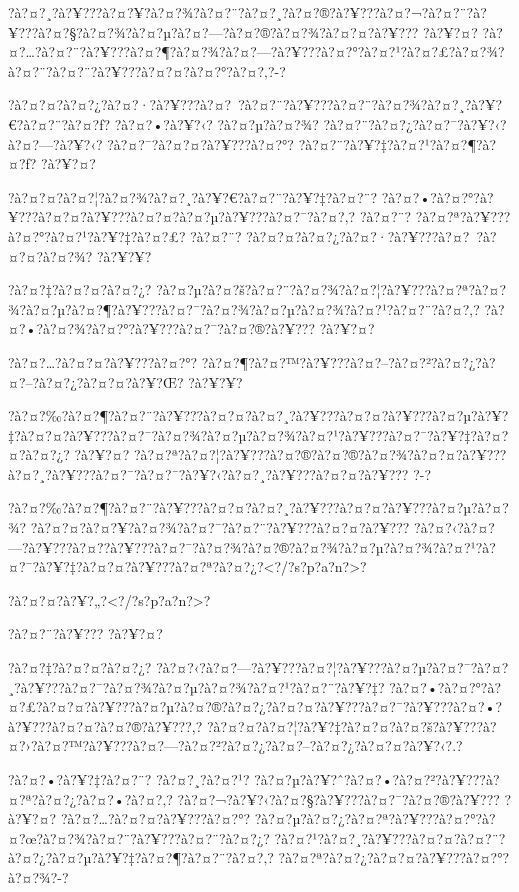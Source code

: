 \documentclass[11pt, openany]{book}
\begin{document}
{{{{{{{{{{?à?¤?¸?à?¥???à?¤?¥?à?¤?¾?à?¤?¨?à?¤?¸?à?¤?®?à?¥???à?¤?¬?à?¤?¨?à?¥???à?¤?§?à?¤?¾?à?¤?µ?à?¤?---?à?¤?®?à?¤?¾?à?¤?¤?à?¥???
?à?¥?¤?
?à?¤?\ldots{}?à?¤?¨?à?¥???à?¤?¶?à?¤?¾?à?¤?---?à?¥???à?¤?°?à?¤?¹?à?¤?£?à?¤?¾?à?¤?¨?à?¤?¨?à?¥???à?¤?¤?à?¤?°?à?¤?‚?-?

?à?¤?¤?à?¤?¿?à?¤?·?à?¥???à?¤?~?à?¤?¨?à?¥???à?¤?¨?à?¤?¾?à?¤?¸?à?¥?€?à?¤?¨?à?¤?ƒ?
?à?¤?•?à?¥?‹? ?à?¤?µ?à?¤?¾? ?à?¤?¨?à?¤?¿?à?¤?¯?à?¥?‹?à?¤?---?à?¥?‹?
?à?¤?¯?à?¤?¤?à?¥???à?¤?°? ?à?¤?¨?à?¥?‡?à?¤?¹?à?¤?¶?à?¤?ƒ? ?à?¥?¤?

?à?¤?¤?à?¤?¦?à?¤?¾?à?¤?¸?à?¥?€?à?¤?¨?à?¥?‡?à?¤?¨?
?à?¤?•?à?¤?°?à?¥???à?¤?¤?à?¥???à?¤?¤?à?¤?µ?à?¥???à?¤?¯?à?¤?‚? ?à?¤?¨?
?à?¤?ª?à?¥???à?¤?°?à?¤?¹?à?¥?‡?à?¤?£? ?à?¤?¨?
?à?¤?¤?à?¤?¿?à?¤?·?à?¥???à?¤?~?à?¤?¤?à?¤?¾? ?à?¥?¥?

?à?¤?‡?à?¤?¤?à?¤?¿?
?à?¤?µ?à?¤?š?à?¤?¨?à?¤?¾?à?¤?¦?à?¥???à?¤?ª?à?¤?¾?à?¤?µ?à?¤?¶?à?¥???à?¤?¯?à?¤?¾?à?¤?µ?à?¤?¾?à?¤?¹?à?¤?¨?à?¤?‚?
?à?¤?•?à?¤?¾?à?¤?°?à?¥???à?¤?¯?à?¤?®?à?¥??? ?à?¥?¤?

?à?¤?\ldots{}?à?¤?¤?à?¥???à?¤?°?
?à?¤?¶?à?¤?™?à?¥???à?¤?--?à?¤?²?à?¤?¿?à?¤?--?à?¤?¿?à?¤?¤?à?¥?Œ? ?à?¥?¥?

?à?¤?‰?à?¤?¶?à?¤?¨?à?¥???à?¤?¤?à?¤?¸?à?¥???à?¤?¤?à?¥???à?¤?µ?à?¥?‡?à?¤?¤?à?¥???à?¤?¯?à?¤?¾?à?¤?µ?à?¤?¾?à?¤?¹?à?¥???à?¤?¯?à?¥?‡?à?¤?¤?à?¤?¿?
?à?¥?¤?
?à?¤?ª?à?¤?¦?à?¥???à?¤?®?à?¤?®?à?¤?¾?à?¤?¤?à?¥???à?¤?¸?à?¥???à?¤?¯?à?¤?¯?à?¥?‹?à?¤?¸?à?¥???à?¤?¤?à?¥???
?-?

?à?¤?‰?à?¤?¶?à?¤?¨?à?¥???à?¤?¤?à?¤?¸?à?¥???à?¤?¤?à?¥???à?¤?µ?à?¤?¾?
?à?¤?¤?à?¤?¥?à?¤?¾?à?¤?¯?à?¤?¨?à?¥???à?¤?¤?à?¥???
?à?¤?‹?à?¤?---?à?¥???à?¤?­?à?¥???à?¤?¯?à?¤?¾?à?¤?®?à?¤?¾?à?¤?µ?à?¤?¾?à?¤?¹?à?¤?¯?à?¥?‡?à?¤?¤?à?¥???à?¤?ª?à?¤?¿?\textless{}?/?s?p?a?n?\textgreater{}?

?à?¤?¤?à?¥?„?\textless{}?/?s?p?a?n?\textgreater{}?

?à?¤?¨?à?¥??? ?à?¥?¤?

?à?¤?‡?à?¤?¤?à?¤?¿?
?à?¤?‹?à?¤?---?à?¥???à?¤?¦?à?¥???à?¤?µ?à?¤?¯?à?¤?¸?à?¥???à?¤?¯?à?¤?¾?à?¤?µ?à?¤?¾?à?¤?¹?à?¤?¨?à?¥?‡?
?à?¤?•?à?¤?°?à?¤?£?à?¤?¤?à?¥???à?¤?µ?à?¤?®?à?¤?¿?à?¤?¤?à?¥???à?¤?¯?à?¥???à?¤?•?à?¥???à?¤?¤?à?¤?®?à?¥???,?
?à?¤?¤?à?¤?¦?à?¥?‡?à?¤?¤?à?¤?š?à?¥???à?¤?›?à?¤?™?à?¥???à?¤?---?à?¤?²?à?¤?¿?à?¤?--?à?¤?¿?à?¤?¤?à?¥?‹?.?

?à?¤?•?à?¥?‡?à?¤?¨? ?à?¤?¸?à?¤?¹?
?à?¤?µ?à?¥?ˆ?à?¤?•?à?¤?²?à?¥???à?¤?ª?à?¤?¿?à?¤?•?à?¤?‚?
?à?¤?¬?à?¥?‹?à?¤?§?à?¥???à?¤?¯?à?¤?®?à?¥??? ?à?¥?¤?
?à?¤?\ldots{}?à?¤?¤?à?¥???à?¤?°?
?à?¤?µ?à?¤?¿?à?¤?ª?à?¥???à?¤?°?à?¤?œ?à?¤?¾?à?¤?¨?à?¥???à?¤?¨?à?¤?¿?
?à?¤?¹?à?¤?¸?à?¥???à?¤?¤?à?¤?¨?à?¤?¿?à?¤?µ?à?¥?‡?à?¤?¶?à?¤?¨?à?¤?‚?
?à?¤?ª?à?¤?¿?à?¤?¤?à?¥???à?¤?°?à?¤?¾?-?

}}}}}}}}}}
\end{document}

